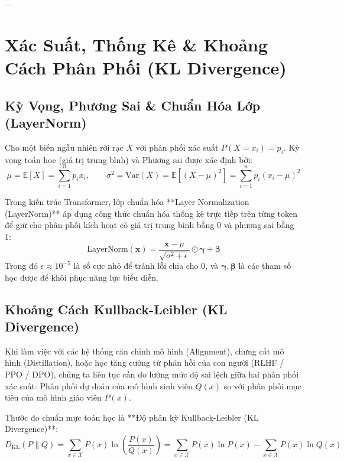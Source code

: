 ---

\section{Xác Suất, Thống Kê \& Khoảng Cách Phân Phối (KL Divergence)}
\label{sec:probability-kl-divergence}

\subsection{Kỳ Vọng, Phương Sai \& Chuẩn Hóa Lớp (LayerNorm)}

Cho một biến ngẫu nhiên rời rạc $X$ với phân phối xác suất $P(X = x_i) = p_i$. Kỳ vọng toán học (giá trị trung bình) và Phương sai được xác định bởi:
\begin{equation}
\mu = \mathbb{E}[X] = \sum_{i=1}^n p_i x_i, \qquad \sigma^2 = \text{Var}(X) = \mathbb{E}[(X - \mu)^2] = \sum_{i=1}^n p_i (x_i - \mu)^2
\end{equation}

Trong kiến trúc Transformer, lớp chuẩn hóa **Layer Normalization (LayerNorm)** áp dụng công thức chuẩn hóa thống kê trực tiếp trên từng token để giữ cho phân phối kích hoạt có giá trị trung bình bằng 0 và phương sai bằng 1:
\begin{equation}
\text{LayerNorm}(\mathbf{x}) = \frac{\mathbf{x} - \mu}{\sqrt{\sigma^2 + \epsilon}} \odot \boldsymbol{\gamma} + \boldsymbol{\beta}
\label{eq:layernorm-formula}
\end{equation}
Trong đó $\epsilon \approx 10^{-5}$ là số cực nhỏ để tránh lỗi chia cho $0$, và $\boldsymbol{\gamma}, \boldsymbol{\beta}$ là các tham số học được để khôi phục năng lực biểu diễn.

\subsection{Khoảng Cách Kullback-Leibler (KL Divergence)}

Khi làm việc với các hệ thống căn chỉnh mô hình (Alignment), chưng cất mô hình (Distillation), hoặc học tăng cường từ phản hồi của con người (RLHF / PPO / DPO), chúng ta liên tục cần đo lường mức độ sai lệch giữa hai phân phối xác suất: Phân phối dự đoán của mô hình sinh viên $Q(x)$ so với phân phối mục tiêu của mô hình giáo viên $P(x)$.

Thước đo chuẩn mực toán học là **Độ phân kỳ Kullback-Leibler (KL Divergence)**:
\begin{equation}
D_{\text{KL}}(P \parallel Q) = \sum_{x \in \mathcal{X}} P(x) \ln \left( \frac{P(x)}{Q(x)} \right) = \sum_{x \in \mathcal{X}} P(x) \ln P(x) - \sum_{x \in \mathcal{X}} P(x) \ln Q(x)
\label{eq:kl-divergence-def}
\end{equation}

